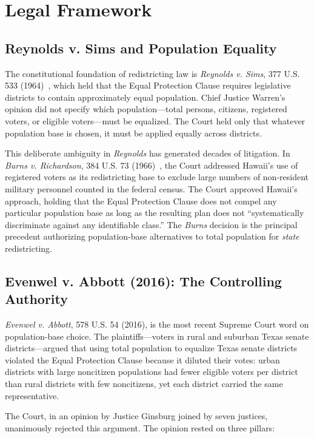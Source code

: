 \section{Legal Framework}
\label{sec:legal}

\subsection{Reynolds v. Sims and Population Equality}

The constitutional foundation of redistricting law is \emph{Reynolds v. Sims}, 377 U.S. 533 (1964)~\citep{reynolds1964}, which held that the Equal Protection Clause requires legislative districts to contain approximately equal population. Chief Justice Warren's opinion did not specify which population---total persons, citizens, registered voters, or eligible voters---must be equalized. The Court held only that whatever population base is chosen, it must be applied equally across districts.

This deliberate ambiguity in \emph{Reynolds} has generated decades of litigation. In \emph{Burns v. Richardson}, 384 U.S. 73 (1966)~\citep{burns1966}, the Court addressed Hawaii's use of registered voters as its redistricting base to exclude large numbers of non-resident military personnel counted in the federal census. The Court approved Hawaii's approach, holding that the Equal Protection Clause does not compel any particular population base as long as the resulting plan does not ``systematically discriminate against any identifiable class.'' The \emph{Burns} decision is the principal precedent authorizing population-base alternatives to total population for \emph{state} redistricting.

\subsection{Evenwel v. Abbott (2016): The Controlling Authority}

\emph{Evenwel v. Abbott}, 578 U.S. 54 (2016), is the most recent Supreme Court word on population-base choice. The plaintiffs---voters in rural and suburban Texas senate districts---argued that using total population to equalize Texas senate districts violated the Equal Protection Clause because it diluted their votes: urban districts with large noncitizen populations had fewer eligible voters per district than rural districts with few noncitizens, yet each district carried the same representative.

The Court, in an opinion by Justice Ginsburg joined by seven justices, unanimously rejected this argument. The opinion rested on three pillars:

